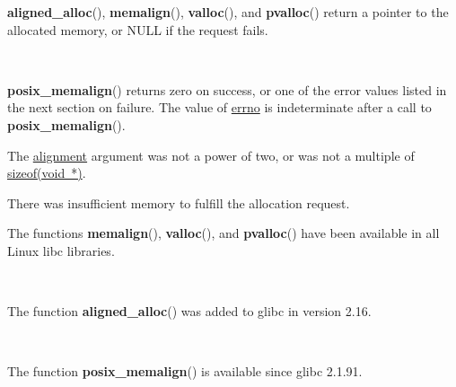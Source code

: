 \documentclass[]{article}
\let\realtextbf=\textbf
\renewcommand{\textbf}[1]{\textcolor{boldcolor}{\realtextbf{#1}}}
\renewcommand{\emph}[1]{\underline{#1}}
\begin{document}

\textbf{aligned\_alloc}(), \textbf{memalign}(), \textbf{valloc}(), and
\textbf{pvalloc}() return a pointer to the allocated memory, or NULL if
the request fails.

~

\textbf{posix\_memalign}() returns zero on success, or one of the error
values listed in the next section on failure. The value of \emph{errno}
is indeterminate after a call to \textbf{posix\_memalign}().


\begin{description}
\itemsep1pt\parskip0pt
\item[\textbf{EINVAL}]
The \emph{alignment} argument was not a power of two, or was not a
multiple of \emph{sizeof(void~*)}.
\end{description}

\begin{description}
\itemsep1pt\parskip0pt
\item[\textbf{ENOMEM}]
There was insufficient memory to fulfill the allocation request.
\end{description}


The functions \textbf{memalign}(), \textbf{valloc}(), and
\textbf{pvalloc}() have been available in all Linux libc libraries.

~

The function \textbf{aligned\_alloc}() was added to glibc in version
2.16.

~

The function \textbf{posix\_memalign}() is available since glibc 2.1.91.

\end{document}
